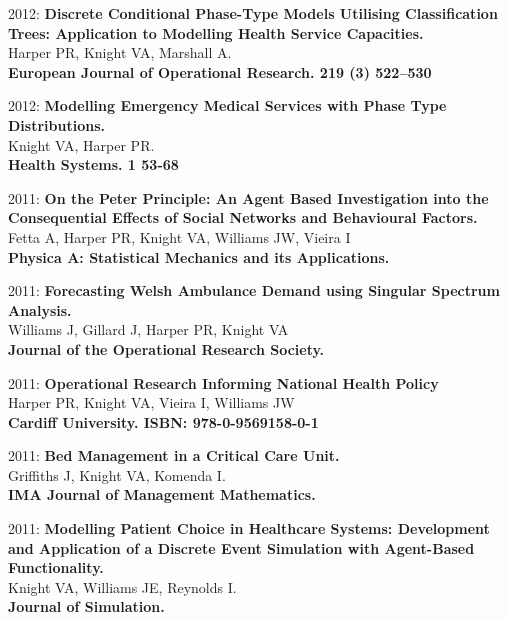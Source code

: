 \documentclass[10pt]{res} %
\begin{document}
\begin{resume}
\begin{etaremune}
\item
2012: \textbf{Discrete Conditional Phase-Type Models Utilising Classification Trees: Application to Modelling Health Service Capacities.}\\
Harper PR, Knight VA, Marshall A.
\\
\textbf{European Journal of Operational Research. 219 (3) 522--530}
\\

\item
2012: \textbf{Modelling Emergency Medical Services with Phase Type Distributions.}\\
Knight VA, Harper PR.
\\
\textbf{Health Systems. 1 53-68}
\\

\item
2011: \textbf{On the Peter Principle: An Agent Based Investigation into the Consequential Effects of Social Networks and Behavioural Factors.}\\
Fetta A, Harper PR, Knight VA, Williams JW, Vieira I
\\
\textbf{Physica A: Statistical Mechanics and its Applications.}
\\

\item
2011: \textbf{Forecasting Welsh Ambulance Demand using Singular Spectrum Analysis.}\\
Williams J, Gillard J, Harper PR, Knight VA
\\
\textbf{Journal of the Operational Research Society.}
\\

\item
2011: \textbf{Operational Research Informing National Health Policy}\\
Harper PR, Knight VA, Vieira I, Williams JW
\\
\textbf{Cardiff University. ISBN: 978-0-9569158-0-1}
\\

\item
2011: \textbf{Bed Management in a Critical Care Unit.}\\
Griffiths J, Knight VA, Komenda I.
\\
\textbf{IMA Journal of Management Mathematics.}
\\

\item
2011: \textbf{Modelling Patient Choice in Healthcare Systems: Development and Application of a Discrete Event Simulation with Agent-Based Functionality.}\\
Knight VA, Williams JE, Reynolds I.
\\
\textbf{Journal of Simulation.}
\\


\end{etaremune}
\end{resume}
\end{document}
